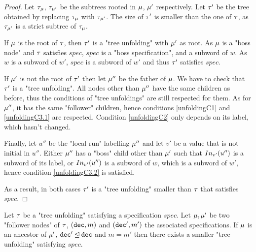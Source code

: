 \ifproofs
\begin{proof}
	Let $\tau_{\mu}$, $\tau_{\mu'}$ be the subtrees rooted in $\mu$, $\mu'$ respectively. 
	Let $\tau'$ be the tree obtained by replacing $\tau_{\mu}$ with $\tau_{\mu'}$. The size of $\tau'$ is smaller than the one of $\tau$, as $\tau_{\mu'}$ is a strict subtree of $\tau_{\mu}$.
	
	If $\mu$ is the root of $\tau$, then $\tau'$ is a "tree unfolding" with $\mu'$ as root. As $\mu$ is a "boss node" and $\tau$ satisfies $spec$, $spec$ is a "boss specification", and a subword of $w$. 
	As $w$ is a subword of $w'$, $spec$ is a subword of $w'$ and thus $\tau'$ satisfies $spec$.
	
	If  $\mu'$ is not the root of $\tau'$ then let $\mu''$ be the father of $\mu$. We have to check that $\tau'$ is a "tree unfolding". 
	All nodes other than $\mu''$ have the same children as before, thus the conditions of "tree unfoldings" are still respected for them.
	As for $\mu''$, it has the same "follower" children, hence conditions \ref{unfoldingC1} and \ref{unfoldingC3.1} are respected. Condition \ref{unfoldingC2} only depends on its label, which hasn't changed.
	
	Finally, let $u''$ be the "local run" labelling $\mu''$ and let $v'$ be a value that is not initial in $u''$. Either $\mu''$ has a "boss" child other than $\mu'$ such that $\vinput{v'}{u''}$ is a subword of its label, or $\vinput{v'}{u''}$ is a subword of $w$, which is a subword of $w'$, hence condition \ref{unfoldingC3.2} is satisfied. 
	
	As a result, in both cases $\tau'$ is a "tree unfolding" smaller than $\tau$ that satisfies $spec$. 
\end{proof}
\fi

\begin{lemma}
	Let $\tau$ be a "tree unfolding" satisfying a specification $spec$.
	Let $\mu, \mu'$ be two "follower nodes" of $\tau$, $(\mathtt{dec},m)$ and $(\mathtt{dec}',m')$ the associated specifications.
	If $\mu$ is an ancestor of $\mu'$, $\mathtt{dec}' \unlhd \mathtt{dec}$ and $m=m'$ then there exists a smaller "tree unfolding" satisfying $spec$. 
\end{lemma}

